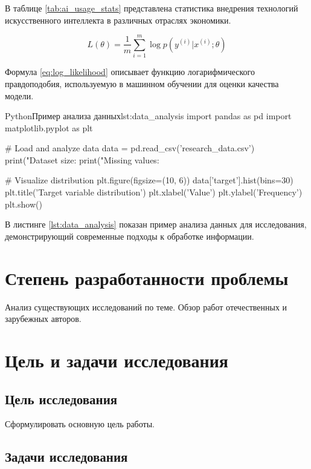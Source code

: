 В таблице \ref{tab:ai_usage_stats} представлена статистика внедрения технологий искусственного интеллекта в различных отраслях экономики.

\begin{equation}
L(\theta) = \frac{1}{m} \sum_{i=1}^{m} \log p(y^{(i)} | x^{(i)}; \theta)
\label{eq:log_likelihood}
\end{equation}

Формула \ref{eq:log_likelihood} описывает функцию логарифмического правдоподобия, используемую в машинном обучении для оценки качества модели.

\begin{CodeBlock}{Python}{Пример анализа данных}{lst:data_analysis}
import pandas as pd
import matplotlib.pyplot as plt

# Load and analyze data
data = pd.read_csv('research_data.csv')
print("Dataset size: %
print("Missing values: %

# Visualize distribution
plt.figure(figsize=(10, 6))
data['target'].hist(bins=30)
plt.title('Target variable distribution')
plt.xlabel('Value')
plt.ylabel('Frequency')
plt.show()
\end{CodeBlock}

В листинге \ref{lst:data_analysis} показан пример анализа данных для исследования, демонстрирующий современные подходы к обработке информации.

\section{Степень разработанности проблемы}

Анализ существующих исследований по теме. Обзор работ отечественных и зарубежных авторов.

\section{Цель и задачи исследования}

\subsection{Цель исследования}

Сформулировать основную цель работы.

\subsection{Задачи исследования}

